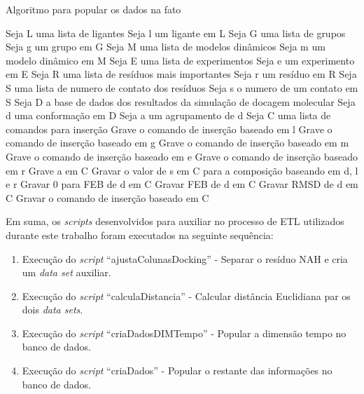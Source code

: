\begin{algorithm}[H]
\caption{Algoritmo para popular os dados na fato}
\label{alg:criaDadosFato}
{\fontsize{10}{10}\selectfont
\begin{algorithmic}[1]
	\STATE Seja L uma lista de ligantes
	\STATE Seja l um ligante em L
	\STATE Seja G uma lista de grupos
	\STATE Seja g um grupo em G
	\STATE Seja M uma lista de modelos dinâmicos
	\STATE Seja m um modelo dinâmico em M
	\STATE Seja E uma lista de experimentos
	\STATE Seja e um experimento em E
	\STATE Seja R uma lista de resíduos mais importantes
	\STATE Seja r um resíduo em R
	\STATE Seja S uma lista de numero de contato dos resíduos
	\STATE Seja s o numero de um contato em S
	\STATE Seja D a base de dados dos resultados da simulação de docagem molecular
	\STATE Seja d uma conformação em D
	\STATE Seja a um agrupamento de d
	\STATE Seja C uma lista de comandos para inserção
		\STATE Grave o comando de inserção baseado em l
	\ENDFOR
		\STATE Grave o comando de inserção baseado em g
        \ENDFOR
		\STATE Grave o comando de inserção baseado em m
        \ENDFOR
		\STATE Grave o comando de inserção baseado em e
        \ENDFOR
		\STATE Grave o comando de inserção baseado em r
	\ENDFOR
		\STATE Grave a em C
				\STATE Gravar o valor de s em C para a composição baseando em d, l e r
			\ENDFOR
				\STATE Gravar 0 para FEB de d em C
			\ELSE
				\STATE Gravar FEB de d em C
			\ENDIF
			\STATE Gravar RMSD de d em C
			\STATE Gravar o comando de inserção baseado em C
		\ENDFOR
	\ENDFOR
\end{algorithmic}
}
\end{algorithm}

Em suma, os \emph{scripts} desenvolvidos para auxiliar no processo de ETL utilizados durante este trabalho foram executados na seguinte sequência:
\begin{enumerate}
    \item Execução do \emph{script} ``ajustaColunasDocking'' - Separar o resíduo NAH e cria um \emph{data set} auxiliar.
    \item Execução do \emph{script} ``calculaDistancia'' - Calcular distância Euclidiana par os dois \emph{data sets}.
    \item Execução do \emph{script} ``criaDadosDIMTempo'' - Popular a dimensão tempo no banco de dados.
    \item Execução do \emph{script} ``criaDados'' - Popular o restante das informações no banco de dados.
\end{enumerate}


